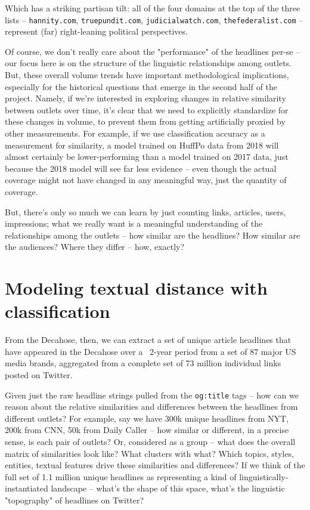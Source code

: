 \documentclass{scrartcl}
\begin{document}
Which has a striking partisan tilt: all of the four domains at the top of the three lists -- \texttt{hannity.com}, \texttt{truepundit.com}, \texttt{judicialwatch.com}, \texttt{thefederalist.com} -- represent (far) right-leaning political perspectives.

Of course, we don't really care about the "performance" of the headlines per-se -- our focus here is on the structure of the linguistic relationships among outlets. But, these overall volume trends have important methodological implications, especially for the historical questions that emerge in the second half of the project. Namely, if we're interested in exploring changes in relative similarity between outlets over time, it's clear that we need to explicitly standardize for these changes in volume, to prevent them from getting artificially proxied by other measurements. For example, if we use classification accuracy as a measurement for similarity, a model trained on HuffPo data from 2018 will almost certainly be lower-performing than a model trained on 2017 data, just because the 2018 model will see far less evidence -- even though the actual coverage might not have changed in any meaningful way, just the quantity of coverage.

But, there's only so much we can learn by just counting links, articles, users, impressions; what we really want is a meaningful understanding of the relationships among the outlets -- how similar are the headlines? How similar are the audiences? Where they differ -- how, exactly?

\section{Modeling textual distance with classification}

From the Decahose, then, we can extract a set of unique article headlines that have appeared in the Decahose over a ~2-year period from a set of 87 major US media brands, aggregated from a complete set of 73 million individual links posted on Twitter.

Given just the raw headline strings pulled from the \texttt{og:title} tags -- how can we reason about the relative similarities and differences between the headlines from different outlets? For example, say we have 300k unique headlines from NYT, 200k from CNN, 50k from Daily Caller -- how similar or different, in a precise sense, is each pair of outlets? Or, considered as a group -- what does the overall matrix of similarities look like? What clusters with what? Which topics, styles, entities, textual features drive these similarities and differences? If we think of the full set of 1.1 million unique headlines as representing a kind of linguistically-instantiated landscape -- what's the shape of this space, what's the linguistic "topography" of headlines on Twitter?
\end{document}
